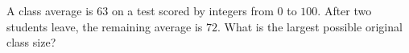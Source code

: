 A class average is $63$ on a test scored by integers from $0$ to $100$. After two students leave, the remaining average is $72$. What is the largest possible original class size?

